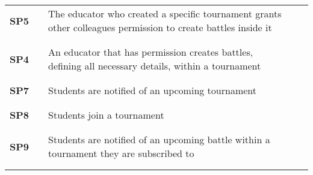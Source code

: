 \begin{longtable}[H]{l l p{8.5cm} l l}
    \textbf{SP5}   & \vline & The educator who created a specific tournament grants other colleagues permission to create battles inside it                   & \vline &                        \\
                   &        &                                                                                                                                 &        &                        \\\hline & & & & \\
    \textbf{SP4}   & \vline & An educator that has permission creates battles, defining all necessary details, within a tournament                            & \vline &                        \\
                   &        &                                                                                                                                 &        &                        \\\hline & & & & \\
    \textbf{SP7}   & \vline & Students are notified of an upcoming tournament                                                                                 & \vline &                        \\
                   &        &                                                                                                                                 &        &                        \\\hline & & & & \\
    \textbf{SP8}   & \vline & Students join a tournament                                                                                                      & \vline &                        \\
                   &        &                                                                                                                                 &        &                        \\\hline & & & & \\
    \textbf{SP9}   & \vline & Students are notified of an upcoming battle within a tournament they are subscribed to                                          & \vline &                        \\
                   &        &                                                                                                                                 &        &                        \\\hline & & & & \\

\end{longtable}
